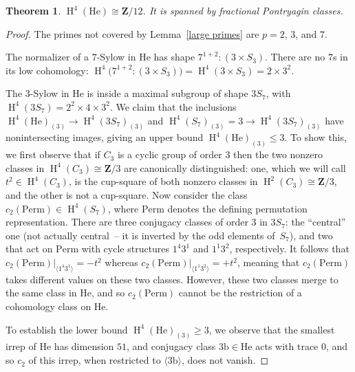 \documentclass[pdftex]{sigma}
\numberwithin{equation}{section}
\newtheorem{Theorem}{Theorem}[section]
\newcommand\bZ{\mathbf Z}
\newcommand\rb{\mathrm b}
\DeclareMathOperator\homology{H}
\renewcommand\H{\homology}
\newcommand\<\langle
\renewcommand\>\rangle
\newcommand\Perm{\mathrm{Perm}}
\begin{document}
\begin{Theorem}\label{thm:he}
 $\H^4(\mathrm{He}) \cong \bZ/12$. It is spanned by fractional Pontryagin classes.
\end{Theorem}
\begin{proof}
 The primes not covered by Lemma~\ref{large primes} are $p=2$, $3$, and $7$.

 The normalizer of a $7$-Sylow in $\mathrm{He}$ has shape $7^{1+2}:(3 \times S_3)$. There are no $7$s in its low cohomology: $\H^4\big(7^{1+2}:(3 \times S_3)\big) = \H^4(3 \times S_3) = 2 \times 3^2$.

 The $3$-Sylow in $\mathrm{He}$ is inside a maximal subgroup of shape $3S_7$, with $\H^4(3S_7) = 2^2 \times 4 \times 3^2$. We claim that the inclusions $\H^4(\mathrm{He})_{(3)} \to \H^4(3S_7)_{(3)}$ and $\H^4(S_7)_{(3)} = 3 \to \H^4(3S_7)_{(3)}$ have nonintersecting images, giving an upper bound $\H^4(\mathrm{He})_{(3)} \leq 3$. To show this, we first observe that if $C_3$ is a cyclic group of order $3$ then the two nonzero classes in $\H^4(C_3) \cong \bZ/3$ are canonically distinguished: one, which we will call $t^2 \in \H^4(C_3)$, is the cup-square of both nonzero classes in $\H^2(C_3) \cong \bZ/3$, and the other is not a cup-square. Now consider the class $c_2(\Perm) \in \H^4(S_7)$, where $\Perm$ denotes the defining permutation representation. There are three conjugacy classes of order $3$ in $3S_7$: the ``central'' one (not actually central~-- it is inverted by the odd elements of~$S_7$), and two that act on $\Perm$ with cycle structures $1^4 3^1$ and $1^1 3^2$, respectively. It follows that $c_2(\Perm)|_{\langle 1^4 3^1\rangle} = -t^2$ whereas $c_2(\Perm)|_{\langle 1^1 3^2\rangle} = +t^2$, meaning that $c_2(\Perm)$ takes different values on these two classes. However, these two classes merge to the same class in $\mathrm{He}$, and so $c_2(\Perm)$ cannot be the restriction of a cohomology class on $\mathrm{He}$.

 To establish the lower bound $\H^4(\mathrm{He})_{(3)} \geq 3$, we observe that the smallest irrep of $\mathrm{He}$ has dimension $51$, and conjugacy class $3\rb \in \mathrm{He}$ acts with trace $0$, and so $c_2$ of this irrep, when restricted to $\langle 3\rb\rangle$, does not vanish.


\end{proof}
\end{document}
